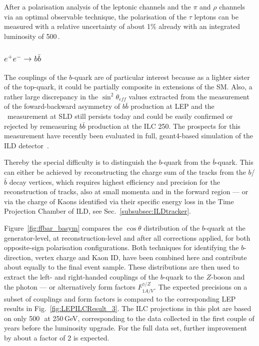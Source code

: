After a polarisation analysis of the leptonic channels and the $\pi$ and $\rho$ channels via an optimal observable technique, the polarisation of the $\tau$ leptons can be measured with a relative uncertainty of about 1\% already with an integrated luminosity of 500\,\ifb.  

\subsubsection{$e^+e^- \to b\bar{b}$}
The couplings of the $b$-quark are of particular interest because as a lighter sister of the top-quark, it could be partially composite in extensions of the SM. Also, a rather large discrepancy in the $\sin^2{\theta_{eff}}$ values extracted from the measurement of the foward-backward asymmetry of $b\bar{b}$ production at LEP and the \ALR\ measurement at SLD still persists today and could be easily 
confirmed or rejected by remeasuring $b\bar{b}$ production at the ILC 250. The prospects for this measurement have recently been evaluated in full, geant4-based simulation of the ILD detector~\cite{Bilokin:2017lco, bilokin:tel-01946099}.

Thereby the special difficulty is to distinguish the $b$-quark from the $\bar{b}$-quark. This can either be achieved by reconstructing the charge sum of the tracks from the $b$/$\bar{b}$ decay vertices, which requires highest efficiency and precision for the reconstruction of tracks, also at small momenta and in the forward region --- or via the charge of Kaons identified via their specific energy loss in the Time Projection Chamber of ILD, see Sec.~\ref{subsubsec:ILDtracker}.

Figure~\ref{fig:ffbar_basym} compares the $\cos{\theta}$ distribution of the $b$-quark at the generator-level, at reconstruction-level and after all corrections applied, for both opposite-sign polarisation configurations. Both techniques for identifying the $b$-direction, vertex charge and Kaon ID, have been combined here and contribute about equally to the final event sample. These distributions are then used to extract the left- and right-handed couplings of the $b$-quark to the $Z$-boson and the photon --- or alternatively form factors $F^{\gamma /Z}_{1A/V}$. The expected precisions on a subset of couplings and form factors is compared to the corresponding LEP results in Fig.~\ref{fig:LEPILCResult_3}. The ILC projections in this plot are based on only 500\,\ifb\ at 250\,GeV, corresponding to the data collected in the first couple of years before the luminosity upgrade. For the full data set, further improvement by about a factor of 2 is expected.



